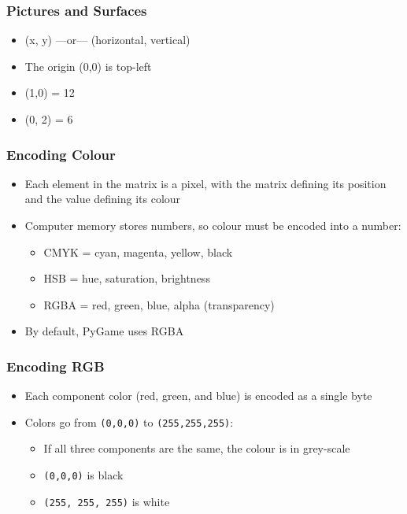 

\begin{frame}
	\frametitle{Pictures and Surfaces}
	
	\begin{itemize}
		\item (x, y) ---or--- (horizontal, vertical)
		\item The origin (0,0) is top-left
		\item (1,0) = 12
		\item (0, 2) = 6
	\end{itemize}
\end{frame}

\begin{frame}
	\frametitle{Encoding Colour}
	
	\begin{itemize}
		\item Each element in the matrix is a pixel, with the matrix defining its position and the value defining  its colour
		\item Computer memory stores numbers, so colour must be encoded into a number:
		\begin{itemize}
			\item CMYK = cyan, magenta, yellow, black
			\item HSB = hue, saturation, brightness
			\item RGBA = red, green, blue, alpha (transparency)
		\end{itemize}
		\item By default, PyGame uses RGBA
	\end{itemize}
\end{frame}

\begin{frame}
	\frametitle{Encoding RGB}
	
	\begin{itemize}
		\item Each component color (red, green, and blue) is encoded as a single byte
		\item Colors go from \lstinline{(0,0,0)} to \lstinline{(255,255,255)}:
		\begin{itemize}
			\item If all three components are the same, the colour is in grey-scale
			\item  \lstinline{(0,0,0)} is black
			\item  \lstinline{(255, 255, 255)} is white
		\end{itemize}
	\end{itemize}
\end{frame}

